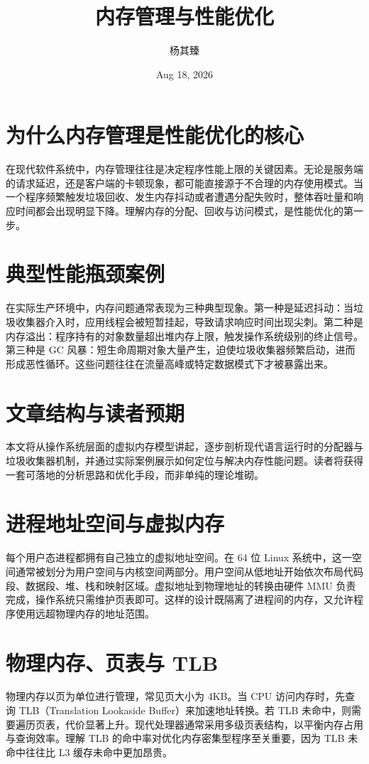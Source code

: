 \title{内存管理与性能优化}
\author{杨其臻}
\date{Aug 18, 2026}
\maketitle
\chapter{为什么内存管理是性能优化的核心}
在现代软件系统中，内存管理往往是决定程序性能上限的关键因素。无论是服务端的请求延迟，还是客户端的卡顿现象，都可能直接源于不合理的内存使用模式。当一个程序频繁触发垃圾回收、发生内存抖动或者遭遇分配失败时，整体吞吐量和响应时间都会出现明显下降。理解内存的分配、回收与访问模式，是性能优化的第一步。\par
\chapter{典型性能瓶颈案例}
在实际生产环境中，内存问题通常表现为三种典型现象。第一种是延迟抖动：当垃圾收集器介入时，应用线程会被短暂挂起，导致请求响应时间出现尖刺。第二种是内存溢出：程序持有的对象数量超出堆内存上限，触发操作系统级别的终止信号。第三种是 GC 风暴：短生命周期对象大量产生，迫使垃圾收集器频繁启动，进而形成恶性循环。这些问题往往在流量高峰或特定数据模式下才被暴露出来。\par
\chapter{文章结构与读者预期}
本文将从操作系统层面的虚拟内存模型讲起，逐步剖析现代语言运行时的分配器与垃圾收集器机制，并通过实际案例展示如何定位与解决内存性能问题。读者将获得一套可落地的分析思路和优化手段，而非单纯的理论堆砌。\par
\chapter{进程地址空间与虚拟内存}
每个用户态进程都拥有自己独立的虚拟地址空间。在 64 位 Linux 系统中，这一空间通常被划分为用户空间与内核空间两部分。用户空间从低地址开始依次布局代码段、数据段、堆、栈和映射区域。虚拟地址到物理地址的转换由硬件 MMU 负责完成，操作系统只需维护页表即可。这样的设计既隔离了进程间的内存，又允许程序使用远超物理内存的地址范围。\par
\chapter{物理内存、页表与 TLB}
物理内存以页为单位进行管理，常见页大小为 4KB。当 CPU 访问内存时，先查询 TLB（Translation Lookaside Buffer）来加速地址转换。若 TLB 未命中，则需要遍历页表，代价显著上升。现代处理器通常采用多级页表结构，以平衡内存占用与查询效率。理解 TLB 的命中率对优化内存密集型程序至关重要，因为 TLB 未命中往往比 L3 缓存未命中更加昂贵。\par
